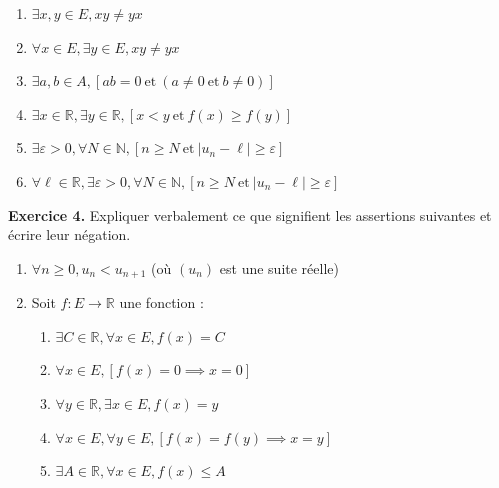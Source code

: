 \documentclass[a4paper, 10pt]{report}
\providecommand{\abs}[1]{\lvert#1\rvert}
\begin{document}
	\colorbox{solution}
	{
		\begin{minipage}{0.9\textwidth}
			\begin{enumerate}[label=\arabic*.]
				\item $\exists x, y \in E, xy \neq yx$
				\item $\forall x \in E, \exists y \in E, xy \neq yx$
				\item $\exists a, b \in A, [ab = 0\ \text{et}\
					(a \neq 0\ \text{et}\ b \neq 0)]$
				\item $\exists x \in \mathbb{R}, \exists y \in \mathbb{R},
					[x < y\ \text{et}\ f(x) \geq f(y)]$
				\item $\exists \varepsilon > 0, \forall N \in \mathbb{N},
					[n \geq N\ \text{et}\ \abs{u_n - \ell} \geq \varepsilon]$
				\item $\forall \ell \in \mathbb{R},
					\exists \varepsilon > 0, \forall N \in \mathbb{N},
					[n \geq N\ \text{et}\ \abs{u_n - \ell} \geq \varepsilon]$
			\end{enumerate}
		\end{minipage}
	}
	
	\newpage
	
	\fancyhf{}
	\renewcommand{\headrule}
	{\rule{\textwidth}{0pt}}
	
	\noindent
	\textbf{Exercice 4.} Expliquer verbalement ce que signifient les
	assertions suivantes et écrire leur négation.
	
	\begin{enumerate}[label=\arabic*.]
		\item $\forall n \geq 0, u_n < u_{n+1}$
		(où $(u_n)$ est une suite réelle)
		\item Soit $f: E \to \mathbb{R}$ une fonction :
		\begin{enumerate}[label=(\alph*)]
			\item $\exists C \in \mathbb{R}, \forall x \in E,
				f(x) = C$
			\item $\forall x \in E,
				[f(x) = 0 \implies x = 0]$
			\item $\forall y \in \mathbb{R}, \exists x \in E,
				f(x) = y$
			\item $\forall x \in E, \forall y \in E,
				[f(x) = f(y) \implies x = y]$
			\item $\exists A \in \mathbb{R}, \forall x \in E,
				f(x) \leq A$
		\end{enumerate}
	\end{enumerate}
	
\end{document}
